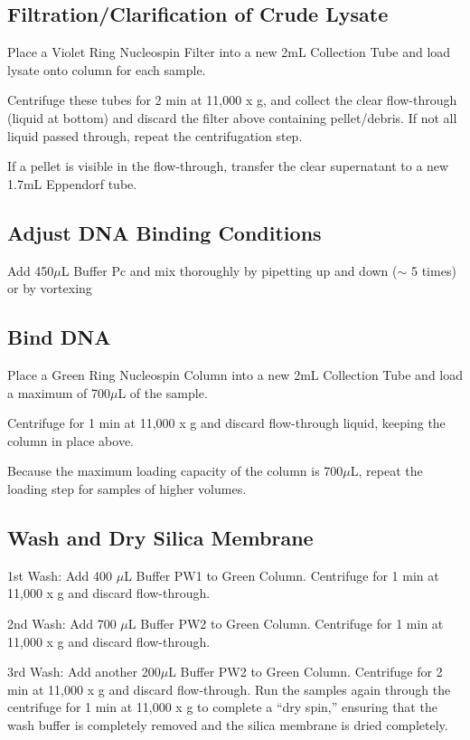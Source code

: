 \documentclass[12pt]{../SOP3_alpha}
\begin{document}
\subsection*{Filtration/Clarification of Crude Lysate}

\NP Place a Violet Ring Nucleospin Filter into a new 2mL Collection Tube and load lysate onto column for each sample. 

\NP Centrifuge these tubes for 2 min at 11,000 x g, and collect the clear flow-through (liquid at bottom) and discard the filter above containing pellet/debris. If not all liquid passed through, repeat the centrifugation step.

\NP If a pellet is visible in the flow-through, transfer the clear supernatant to a new 1.7mL Eppendorf tube. 


\subsection*{Adjust DNA Binding Conditions}

\NP Add 450$\mu$L Buffer Pc and mix thoroughly by pipetting up and down ($\sim$ 5 times) or by vortexing


\subsection*{Bind DNA}

\NP Place a Green Ring Nucleospin Column into a new 2mL Collection Tube and load a maximum of 700$\mu$L of the sample.

\NP Centrifuge for 1 min at 11,000 x g and discard flow-through liquid, keeping the column in place above. 

\NP Because the maximum loading capacity of the column is 700$\mu$L, repeat the loading step for samples of higher volumes.

\subsection*{Wash and Dry Silica Membrane}

\NP 1st Wash: Add 400 $\mu$L Buffer PW1 to Green Column. Centrifuge for 1 min at 11,000 x g and discard flow-through.

\NP 2nd Wash: Add 700 $\mu$L Buffer PW2 to Green Column. Centrifuge for 1 min at 11,000 x g and discard flow-through.

\NP 3rd Wash: Add another 200$\mu$L Buffer PW2 to Green Column. Centrifuge for 2 min at 11,000 x g and discard flow-through. Run the samples again through the centrifuge for 1 min at 11,000 x g to complete a ``dry spin,'' ensuring that the wash buffer is completely removed and the silica membrane is dried completely. 
\end{document}
